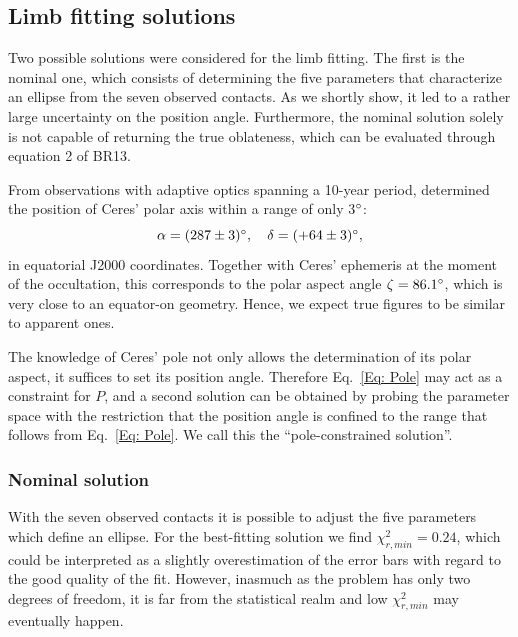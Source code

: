 \documentclass[useAMS,usenatbib]{mn2e}
\begin{document}
\subsection{Limb fitting solutions}\label{Sec: limbfitting-2010}

Two possible solutions were considered for the limb fitting. The first is the nominal one, which consists of determining the five parameters that characterize an ellipse from the seven observed contacts. As we shortly show, it led to a rather large uncertainty on the position angle. Furthermore, the nominal solution solely is not capable of returning the true oblateness, which can be evaluated through equation 2 of BR13.%

From observations with adaptive optics spanning a 10-year period, \cite{Drummond2014} determined the position of Ceres' polar axis within a range of only 3$\hbox{$^\circ$}$:
\begin{equation}
\alpha = (287 \pm 3) \degr, \quad %
\delta = (+64 \pm 3) \degr,
\label{Eq: Pole}
\end{equation}
%
in equatorial J2000 coordinates. Together with Ceres' ephemeris at the moment of the occultation, this corresponds to the polar aspect angle $\zeta = 86.1\hbox{$^\circ$}$, which is very close to an equator-on geometry. Hence, we expect true figures to be similar to apparent ones.

The knowledge of Ceres' pole not only allows the determination of its polar aspect, it suffices to set its position angle. Therefore Eq.~\ref{Eq: Pole} may act as a constraint for $P$, and a second solution can be obtained by probing the parameter space with the restriction that the position angle is confined to the range that follows from Eq.~\ref{Eq: Pole}. We call this the ``pole-constrained solution''.


\subsubsection{Nominal solution}

With the seven observed contacts it is possible to adjust the five parameters which define an ellipse. For the best-fitting solution we find $\chi^2_{r,min} = 0.24$, which could be interpreted as a slightly overestimation of the error bars with regard to the good quality of the fit. However, inasmuch as the problem has only two degrees of freedom, it is far from the statistical realm and low $\chi^2_{r,min}$ may eventually happen.
\end{document}
